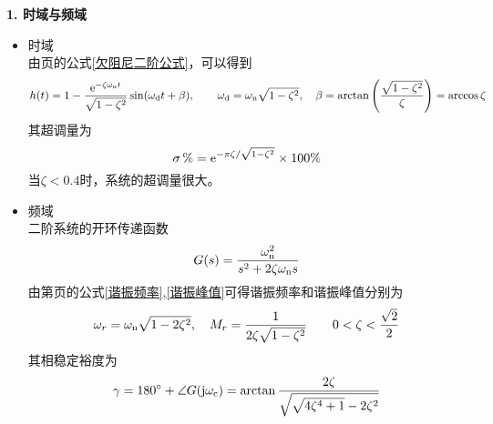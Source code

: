 \noindent \textbf{1. 时域与频域}
\begin{itemize}
	\item 时域\\
	由\pageref{欠阻尼二阶公式}页的公式\eqref{欠阻尼二阶公式}，可以得到
	\[
		h(t) = 1 - \dfrac{{\rm{e}}^{-\zeta \omega_{\rm{n}} t}}{\sqrt{1 - \zeta^2}}\sin (\omega_\text{d}t + \beta), \quad \quad \omega_{\text{d}} = \omega_{{\rm{n}}} \sqrt{1 - \zeta^2},\quad \beta = \arctan\left(\dfrac{\sqrt{1 - \zeta^2}}{\zeta}\right) = \arccos\zeta
	\]
	其超调量为
	\[
	\sigma \, \%  ={\rm{e}}^{- \pi \zeta / \sqrt{ 1 - \zeta^2}} \times 100 \%
	\]
	当$\zeta < 0.4$时，系统的超调量很大。
	
	\item 频域\\
	二阶系统的开环传递函数
	\[
	G(s) = \dfrac{\omega_{\rm{n}}^2}{s^2 + 2 \zeta \omega_{\rm{n}} s}
	\]
	由第\pageref{谐振峰值}页的公式\eqref{谐振频率},\eqref{谐振峰值}可得谐振频率和谐振峰值分别为
	\[
		\omega_r = \omega_{\rm{n}} \sqrt{1 - 2\zeta^2},\quad 
		M_r = \dfrac{1}{2 \zeta \sqrt{1 - \zeta^2}}\quad \quad 0< \zeta < \dfrac{\sqrt{2}}{2}
	\]
	其相稳定裕度为
	\begin{align}
		\gamma = 180{}^{\circ} + \angle G(\text{j} \omega_{\text{c}}) = \arctan \dfrac{2 \zeta}{\sqrt{\sqrt{4 \zeta^4 + 1}-2 \zeta^2}}
	\end{align}
\end{itemize}

